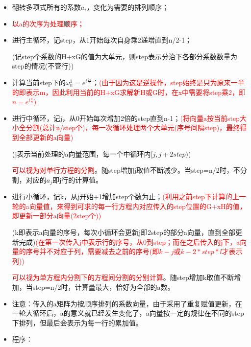 \documentclass[UTF8]{article}%
\begin{document}
\begin{itemize}
    \item 翻转多项式所有的系数$a_i$，变化为需要的排列顺序；
    \item \textcolor{red}{以a的次序为处理顺序；}
    \item 进行主循环，记step，从1开始每次自身乘2递增直到n/2-1；
    
    (记step个系数的H+xG的值为大单元，则step表示分治下各部分系数数量为step的情况(不管行))
    
    \item 计算当前step下的$\omega_n^1=e^{i \frac{2 \pi}{n}}$；\textcolor{red}{(由于因为这是逆操作，step始终是只为原来一半的即表示m，因此利用当前的H+xG求解新H或G时，在x中需要将step乘2，即$n=e^{i \frac{\pi}{n}}$)}
    \item 进行中循环，记j，从0开始每次增加2倍的step直到n-1；\textcolor{red}{(将向量a按当前step大小全分割(总计n/step个)，每一次循环处理两个大单元(序号间隔step)，最终得到全部更新的a向量)}
    
    (j表示当前处理的a向量范围，每一个中循环内$[j,j+2step)$)

    \textcolor{red}{可以视为对单行方程的分割}。随step增加j取值不断减少。当step=n/2时，不分割，对应的$a_j$即j行的计算值。

    \item 进行小循环，记k，从j开始+1增加step个数为止；\textcolor{red}{(利用之前step下计算的上一轮的a向量值，来得到可求的每一行方程内对应传入的step位置的G+xH的值，即更新一部分a向量(2step个))}
    
    (k即表示a向量的序号，每次小循环会更新j即2step的部分a向量，直到全部更新完成)\textcolor{red}{(在第一次传入j中表示行的序号，从0到step；而在之后传入的j下，a向量的序号并不对应于列，需要减去之前的序号(即$k-j$或$k-2*step*l$才表示列))}

    \textcolor{red}{可以视为单方程内分割下的方程间分割的分别计算}。随step增加k取值不断增加，当step=n/2时，计算量最大，恰好为全部的a数。

    \item 注意：传入的a矩阵为按顺序排列的系数向量，由于采用了重复赋值更新，在一轮大循环后，a的意义就已经发生变化了，a向量按一定的规律在不同的step下排列，但最后会表示为每一行的累加值。
    \item 程序：
    

\end{itemize}
\end{document}
